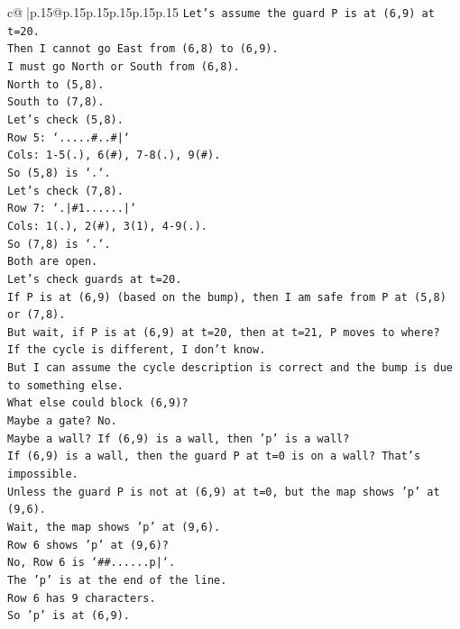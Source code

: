 \documentclass{article}
\begin{document}
{\begin{supertabular}{c@{$\;$}|p{.15\linewidth}@{}p{.15\linewidth}p{.15\linewidth}p{.15\linewidth}p{.15\linewidth}p{.15\linewidth}}
{{{\texttt{Let's assume the guard P is at (6,9) at t=20.} \\
\texttt{Then I cannot go East from (6,8) to (6,9).} \\
\texttt{I must go North or South from (6,8).} \\
\texttt{North to (5,8).} \\
\texttt{South to (7,8).} \\
\texttt{Let's check (5,8).} \\
\texttt{Row 5: `.....\#..\#|`} \\
\texttt{Cols: 1{-}5(.), 6(\#), 7{-}8(.), 9(\#).} \\
\texttt{So (5,8) is `.`.} \\
\texttt{Let's check (7,8).} \\
\texttt{Row 7: `.|\#1......|`} \\
\texttt{Cols: 1(.), 2(\#), 3(1), 4{-}9(.).} \\
\texttt{So (7,8) is `.`.} \\
\texttt{Both are open.} \\
\texttt{Let's check guards at t=20.} \\
\texttt{If P is at (6,9) (based on the bump), then I am safe from P at (5,8) or (7,8).} \\
\texttt{But wait, if P is at (6,9) at t=20, then at t=21, P moves to where?} \\
\texttt{If the cycle is different, I don't know.} \\
\texttt{But I can assume the cycle description is correct and the bump is due to something else.} \\
\texttt{What else could block (6,9)?} \\
\texttt{Maybe a gate? No.} \\
\texttt{Maybe a wall? If (6,9) is a wall, then 'p' is a wall?} \\
\texttt{If (6,9) is a wall, then the guard P at t=0 is on a wall? That's impossible.} \\
\texttt{Unless the guard P is not at (6,9) at t=0, but the map shows 'p' at (9,6).} \\
\texttt{Wait, the map shows 'p' at (9,6).} \\
\texttt{Row 6 shows 'p' at (9,6)?} \\
\texttt{No, Row 6 is `\#\#......p|`.} \\
\texttt{The 'p' is at the end of the line.} \\
\texttt{Row 6 has 9 characters.} \\
\texttt{So 'p' is at (6,9).} \\
}}}
\end{supertabular}}
\end{document}
